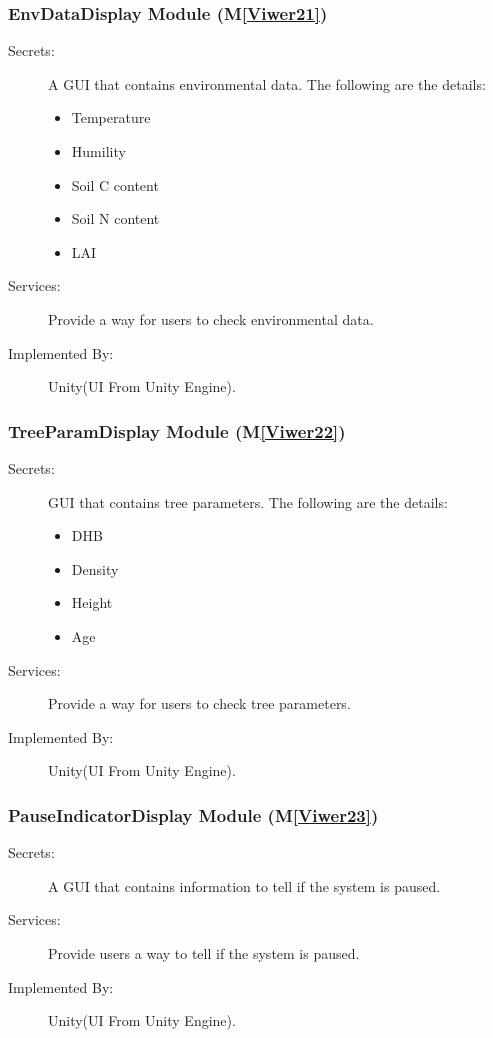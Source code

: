 \documentclass[12pt, titlepage]{article}
\newcommand{\mref}[1]{M\ref{#1}}
\newcommand{\UUI}{Unity(UI From Unity Engine).}
\begin{document}
\subsubsection{EnvDataDisplay Module (\mref{Viwer21})}
\begin{description}
\item[Secrets:] A GUI that contains environmental data. The following are the details:
\begin{itemize}
\item Temperature
\item Humility
\item Soil C content
\item Soil N content
\item LAI
\end{itemize}
\item[Services:] Provide a way for users to check environmental data.
\item[Implemented By:] \UUI
\end{description}

\subsubsection{TreeParamDisplay Module (\mref{Viwer22})}
\begin{description}
\item[Secrets:] GUI that contains tree parameters. The following are the details:
\begin{itemize}
\item DHB
\item Density
\item Height
\item Age
\end{itemize}
\item[Services:] Provide a way for users to check tree parameters.
\item[Implemented By:] \UUI
\end{description}

\subsubsection{PauseIndicatorDisplay Module (\mref{Viwer23})}
\begin{description}
\item[Secrets:] A GUI that contains information to tell if the system is paused.
\item[Services:] Provide users a way to tell if the system is paused.
\item[Implemented By:] \UUI
\end{description}
\end{document}
